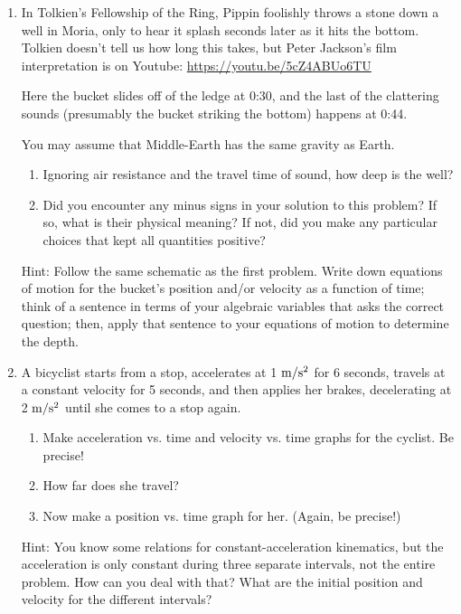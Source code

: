 \documentclass[12pt]{article}
\begin{document}
\begin{enumerate}
\bigskip
\bigskip

\item In Tolkien's Fellowship of the Ring, Pippin foolishly throws a stone down a well in Moria, only to hear it splash seconds later as it hits the bottom.
Tolkien doesn't tell us how long this takes, but Peter Jackson's film interpretation is on Youtube:
\url{https://youtu.be/5cZ4ABUo6TU}

Here the bucket slides off of the ledge at 0:30, and the last of the clattering sounds (presumably the bucket striking the bottom) happens at 0:44.

You may assume that Middle-Earth has the same gravity as Earth. 

\begin{enumerate}
\item Ignoring air resistance and the travel time of sound, how deep is the well?
\item Did you encounter any minus signs in your solution to this problem? If so, what is their physical meaning?
If not, did you make any particular choices that kept all quantities positive?
\end{enumerate}

Hint: Follow the same schematic as the first problem. Write down equations of motion for the bucket's position
and/or velocity as a function of time; think of a sentence in terms of your 
algebraic variables that asks the correct question; then, apply that sentence to your equations of motion 
to determine the depth.

\bigskip
\bigskip

\item A bicyclist starts from a stop, accelerates at 1 $\rm m/\rm s^2$ for 6 seconds, travels at a constant velocity for 5 seconds, and then applies her brakes, decelerating at 2 $\rm m/\rm s^2$ until she comes to a stop again.

\begin{enumerate}
\item{Make acceleration vs. time and velocity vs. time graphs for the cyclist. Be precise!}
\item{How far does she travel?}
\item{Now make a position vs. time graph for her. (Again, be precise!)}
\end{enumerate}

Hint: You know some relations for constant-acceleration kinematics, but the acceleration is only constant during three separate intervals, not the entire problem. How can you deal with that? What are the initial position and velocity for the different intervals?


\end{enumerate}
\end{document}
